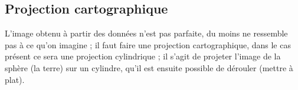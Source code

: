 \subsection{Projection cartographique}

L'image obtenu à partir des données n'est pas parfaite, du moins ne ressemble pas à ce qu'on imagine ;
il faut faire une projection cartographique, dans le cas présent ce sera une projection cylindrique ;
il s'agit de projeter l'image de la sphère (la terre) sur un cylindre, qu'il est ensuite possible de dérouler (mettre à plat).
